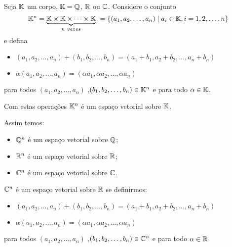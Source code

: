\documentclass{beamer}
\begin{document}
\begin{frame}
    \begin{exemplos}
        Seja $\mathbb{K}$ um corpo,  $\mathbb{K} = \mathbb{Q}$, $\mathbb{R}$ ou $\mathbb{C}$.  Considere o conjunto
            \[
                \mathbb{K}^n = \underbrace{\mathbb{K} \times \mathbb{K} \times \cdots \times \mathbb{K}}_{n\ vezes}\ =  \{(a_1, a_2,\dots,a_n) \mid a_i \in \mathbb{K}, i =1, 2, \dots, n\}
            \]
            e defina
            \begin{itemize}[label=$\color{blue}\bullet$]
                \item $(a_1, a_2, \dots, a_n) + (b_1, b_2, \dots,b_n) = (a_1 + b_1, a_2 + b_2,\dots, a_n + b_n)$

                \item $\alpha (a_1, a_2, \dots,a_n) = (\alpha a_1, \alpha a_2, \dots, \alpha a_n)$
            \end{itemize}
            para todos $(a_1, a_2, \dots,a_n)$ ,$(b_1, b_2, \dots,b_n) \in \mathbb{K}^n$  e para todo $\alpha \in \mathbb{K}$.

            \vspace*{.2cm}

            Com estas operações $\mathbb{K}^n$ é um espaço vetorial sobre $\mathbb{K}$.

            \vspace*{.2cm}

            Assim temos:
                \begin{itemize}[label=$\color{blue}\blacktriangleright$]
                    \item $\mathbb{Q}^n$  é um espaço vetorial sobre $\mathbb{Q}$;
                    \item $\mathbb{R}^n$  é um espaço vetorial sobre $\mathbb{R}$;
                    \item $\mathbb{C}^n$  é um espaço vetorial sobre $\mathbb{C}$.
                \end{itemize}
    \end{exemplos}
\end{frame}

\begin{frame}
    \begin{exemplos}
    $\mathbb{C}^n$  é um espaço vetorial sobre $\mathbb{R}$  se definirmos:
        \begin{itemize}[label=$\color{blue}\bullet$]
            \item $(a_1, a_2, \dots, a_n) + (b_1, b_2, \dots,b_n)  = (a_1 + b_1, a_2 + b_2,\dots, a_n + b_n)$
            \item $\alpha (a_1, a_2, \dots,a_n) = (\alpha a_1, \alpha a_2, \dots, \alpha a_n)$
        \end{itemize}
        para todos $(a_1, a_2, \dots,a_n)$ ,$(b_1, b_2, \dots,b_n) \in \mathbb{C}^n$  e para todo $\alpha \in \mathbb{R}$.
    \end{exemplos}
\end{frame}
\end{document}

